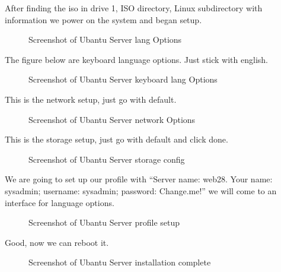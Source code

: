 \documentclass{article}
\begin{document}
	After finding the iso in drive 1, ISO directory, Linux subdirectory with information we power on the system and began setup.

		\FloatBarrier
		\begin{figure}[h!]
			\centering
			\caption{Screenshot of Ubantu Server lang Options}
		\end{figure}
		\FloatBarrier


	The figure below are keyboard language options. Just stick with english.

		\FloatBarrier
		\begin{figure}[h!]
			\centering
			\caption{Screenshot of Ubantu Server keyboard lang Options}
		\end{figure}
		\FloatBarrier


	This is the network setup, just go with default.

		\FloatBarrier
		\begin{figure}[h!]
			\centering
			\caption{Screenshot of Ubantu Server network Options}
		\end{figure}
		\FloatBarrier


	This is the storage setup, just go with default and click done.

		\FloatBarrier
		\begin{figure}[h!]
			\centering
			\caption{Screenshot of Ubantu Server storage config}
		\end{figure}
		\FloatBarrier


	We are going to set up our profile with “Server name: web28. Your name: sysadmin; username: sysadmin; password: Change.me!” we will come to an interface for language options.

		\FloatBarrier
		\begin{figure}[h!]
			\centering
			\caption{Screenshot of Ubantu Server profile setup}
		\end{figure}
		\FloatBarrier


	Good, now we can reboot it.

		\FloatBarrier
		\begin{figure}[h!]
			\centering
			\caption{Screenshot of Ubantu Server installation complete}
		\end{figure}
		\FloatBarrier
\end{document}
